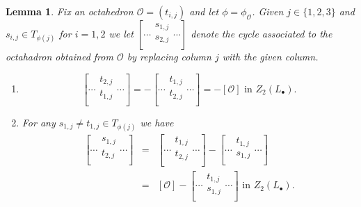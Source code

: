\documentclass[12pt]{amsart}
\newtheorem{lem}{Lemma}[section]
\theoremstyle{definition}
\newcommand{\oct}{\mathcal{O}}%
\newcommand{\cyc}[1]{\left[ #1\right]} %
\newcommand{\<}{\langle}
\renewcommand{\>}{\rangle}
\begin{document}
\begin{lem}\label{lem:oct1} Fix an octahedron ${\oct}=( t_{i,j})$ and let $\phi=\phi_\oct$. Given $j\in \{ 1,2,3\}$ and $s_{i,j}\in T_{\phi(j)}$ for $i=1,2$ we let
$
\cyc{\cdots
\begin{array}{c}
s_{1,j}\\
s_{2,j}\\
\end{array}
\cdots
}
$
denote the cycle associated to the octahadron obtained from $\oct$ by replacing column $j$ with the given column. 

\begin{enumerate}
\item
\[
\cyc{\cdots
\begin{array}{c}
t_{2,j}\\
t_{1,j}\\
\end{array}
\cdots
}=
-\cyc{\cdots
\begin{array}{c}
t_{1,j}\\
t_{2,j}\\
\end{array}
\cdots
}=-\cyc{\oct} \mbox{ in } Z_2(L_\bullet).
\]

\item For any $s_{1,j}\not=t_{1,j}\in T_{\phi(j)}$ we have 
\begin{eqnarray*}
\cyc{\cdots
\begin{array}{c}
s_{1,j}\\
t_{2,j}\\
\end{array}
\cdots
}
&=&
\cyc{\cdots
\begin{array}{c}
t_{1,j}\\
t_{2,j}\\
\end{array}
\cdots}
-
\cyc{\cdots
\begin{array}{c}
t_{1,j}\\
s_{1,j}\\
\end{array}
\cdots
}\\
&=&
\cyc{\oct}
-
\cyc{\cdots
\begin{array}{c}
t_{1,j}\\
s_{1,j}\\
\end{array}
\cdots
}\mbox{ in } Z_2(L_\bullet).\\
\end{eqnarray*}
\end{enumerate}
\end{lem}
\end{document}
